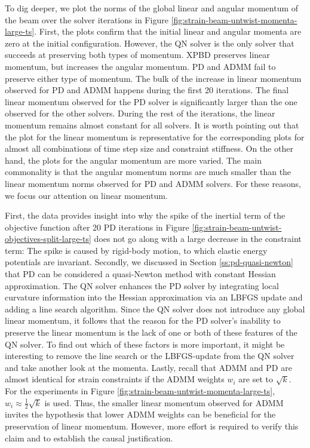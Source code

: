 To dig deeper, we plot the norms of the global linear and angular momentum of the beam over the solver iterations in 
Figure \ref{fig:strain-beam-untwist-momenta-large-ts}. First, the plots confirm that the initial linear and angular momenta are zero at the initial 
configuration. However, the QN solver is the only solver that succeeds at preserving both types of momentum. XPBD preserves linear momentum, 
but increases the angular momentum. PD and ADMM fail to preserve either type of momentum. The bulk of the 
increase in linear momentum observed for PD and ADMM happens during the first 20 iterations. The final linear momentum observed for the PD solver is 
significantly larger than the one observed for the other solvers. During the rest of the iterations, the linear momentum remains almost constant for all solvers. 
It is worth pointing out that the plot for the linear momentum is representative for the corresponding plots for almost all combinations of time step size and 
constraint stiffness. On the other hand, the plots for the angular momentum are more varied. The main commonality is that the angular momentum norms are much 
smaller than the linear momentum norms observed for PD and ADMM solvers. For these reasons, we focus our attention on linear momentum. 

First, the data provides insight into why the spike of the inertial term of the objective function after 20 PD iterations in 
Figure \ref{fig:strain-beam-untwist-objectives-split-large-ts} does not go along with a large decrease in the constraint term: The spike is caused by 
rigid-body motion, to which elastic energy potentials are invariant. Secondly, we discussed in Section \ref{ss:pd-quasi-newton} that PD can be considered 
a quasi-Newton method with constant Hessian approximation. The QN solver enhances the PD solver by integrating local curvature information into the Hessian 
approximation via an LBFGS update and adding a line search algorithm. Since the QN solver does not introduce any global linear momentum, it follows that
the reason for the PD solver's inability to preserve the linear momentum is the lack of one or both of these features of the QN solver. To find out which of 
these factors is more important, it might be interesting to remove the line search or the LBFGS-update from the QN solver and take another look at the momenta. 
Lastly, recall that ADMM and PD are almost identical for strain constraints if the ADMM weights $w_i$ are set to $\sqrt{k}$. For the experiments in 
Figure \ref{fig:strain-beam-untwist-momenta-large-ts}, $w_i \approx \frac{1}{2}\sqrt{k}$ is used. Thus, the smaller linear momentum observed for ADMM invites 
the hypothesis that lower ADMM weights can be beneficial for the preservation of linear momentum. However, more effort is required to verify this claim and 
to establish the causal justification. 

